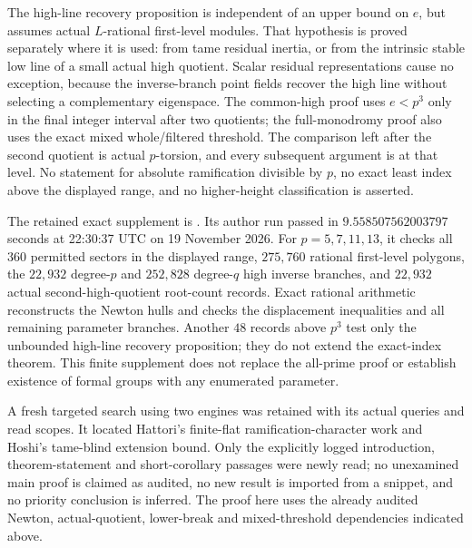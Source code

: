 \begin{remark}
\label{rem:B-RD73-scope}
The high-line recovery proposition is independent of an upper bound
on \(e\), but assumes actual \(L\)-rational first-level modules.
That hypothesis is proved separately where it is used: from tame
residual inertia, or from the intrinsic stable low line of a small
actual high quotient. Scalar residual representations cause no
exception, because the inverse-branch point fields recover the
high line without selecting a complementary eigenspace.
The common-high proof uses \(e<p^3\) only in the final integer
interval after two quotients; the full-monodromy proof also uses
the exact mixed whole/filtered threshold.
The comparison left after the second quotient is actual
\(p\)-torsion, and every subsequent argument is at that level.
No statement for absolute ramification divisible by \(p\),
no exact least index above the displayed range, and no higher-height
classification is asserted.

The retained exact supplement is
.
Its author run passed in \(9.558507562003797\) seconds at
22:30:37 UTC on 19 November 2026. For \(p=5,7,11,13\), it
checks all \(360\) permitted sectors in the displayed range,
\(275{,}760\) rational first-level polygons, the
\(22{,}932\) degree-\(p\) and \(252{,}828\) degree-\(q\)
high inverse branches, and \(22{,}932\) actual second-high-quotient
root-count records. Exact rational arithmetic reconstructs the
Newton hulls and checks the displacement inequalities and all
remaining parameter branches. Another \(48\) records above
\(p^3\) test only the unbounded high-line recovery proposition;
they do not extend the exact-index theorem. This finite supplement
does not replace the all-prime proof or establish existence of
formal groups with any enumerated parameter.

A fresh targeted search using two engines was retained with its
actual queries and read scopes. It located Hattori's finite-flat
ramification-character work and Hoshi's tame-blind extension
bound. Only the explicitly logged introduction, theorem-statement
and short-corollary passages were newly read; no unexamined main
proof is claimed as audited, no new result is imported from a
snippet, and no priority conclusion is inferred. The proof here
uses the already audited Newton, actual-quotient, lower-break and
mixed-threshold dependencies indicated above.
\end{remark}
